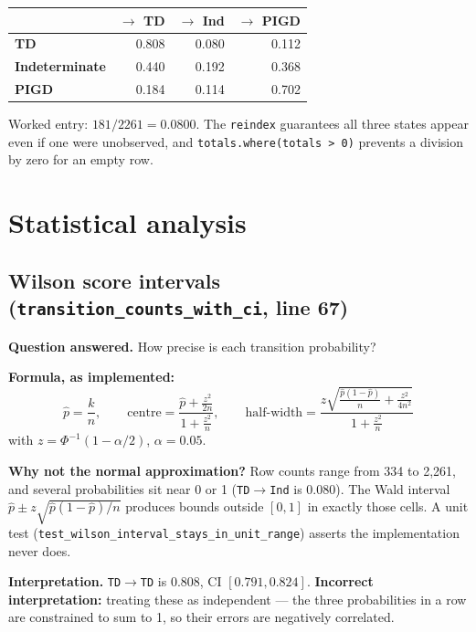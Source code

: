 \documentclass[11pt,a4paper]{article}
\newcommand{\code}[1]{\texttt{\small #1}}
\newcommand{\arr}{$\rightarrow$}
\begin{document}
\begin{table}[h]
\centering
\begin{tabular}{@{}lrrr@{}}
\toprule
& \textbf{$\rightarrow$ TD} & \textbf{$\rightarrow$ Ind} & \textbf{$\rightarrow$ PIGD} \\
\midrule
\textbf{TD}            & 0.808 & 0.080 & 0.112 \\
\textbf{Indeterminate} & 0.440 & 0.192 & 0.368 \\
\textbf{PIGD}          & 0.184 & 0.114 & 0.702 \\
\bottomrule
\end{tabular}
\end{table}

\noindent
Worked entry: $181 / 2261 = 0.0800$. The \code{reindex} guarantees all three
states appear even if one were unobserved, and \code{totals.where(totals > 0)}
prevents a division by zero for an empty row.

\section{Statistical analysis}
\label{sec:stats}

\subsection{Wilson score intervals \quad (\code{transition\_counts\_with\_ci}, line 67)}

\textbf{Question answered.} How precise is each transition probability?

\textbf{Formula, as implemented:}
\[
  \hat p = \frac{k}{n}, \qquad
  \text{centre} = \frac{\hat p + \frac{z^2}{2n}}{1 + \frac{z^2}{n}}, \qquad
  \text{half-width} = \frac{z\sqrt{\frac{\hat p(1-\hat p)}{n} + \frac{z^2}{4n^2}}}{1 + \frac{z^2}{n}}
\]
with $z = \Phi^{-1}(1 - \alpha/2)$, $\alpha = 0.05$.

\textbf{Why not the normal approximation?} Row counts range from 334 to
2{,}261, and several probabilities sit near 0 or 1 (\code{TD}\arr\code{Ind} is
0.080). The Wald interval $\hat p \pm z\sqrt{\hat p(1-\hat p)/n}$ produces
bounds outside $[0,1]$ in exactly those cells. A unit test
(\code{test\_wilson\_interval\_stays\_in\_unit\_range}) asserts the
implementation never does.

\textbf{Interpretation.} \code{TD}\arr\code{TD} is $0.808$, CI
$[0.791, 0.824]$. \textbf{Incorrect interpretation:} treating these as
independent --- the three probabilities in a row are constrained to sum to 1,
so their errors are negatively correlated.
\end{document}
